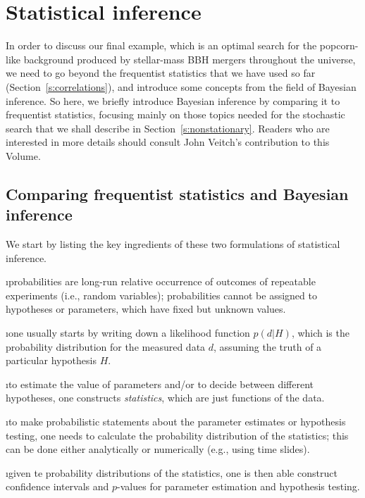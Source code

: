 \section{Statistical inference}
\label{s:statistical_inference}

In order to discuss our final example, which is an
optimal search for the popcorn-like background
produced by stellar-mass BBH mergers throughout the 
universe, we need to go beyond the frequentist 
statistics that we have used so far 
(Section~\ref{s:correlations}), 
and introduce some concepts from the field of Bayesian inference.
So here, we briefly introduce Bayesian inference by comparing 
it to frequentist statistics, focusing mainly on those topics 
needed for the stochastic search that we shall describe in
Section~\ref{s:nonstationary}.
Readers who are interested in more details should 
consult John Veitch's contribution to this Volume.

\subsection{Comparing frequentist statistics and Bayesian inference}

We start by listing the key ingredients of these two formulations 
of statistical inference.
\medskip


\bi

\i probabilities are long-run relative occurrence of 
outcomes of repeatable experiments (i.e., random variables);
probabilities cannot be assigned to hypotheses or parameters, 
which have fixed but unknown values.

\i one usually starts by writing down a likelihood 
function $p(d|H)$, which is the probability distribution 
for the measured data $d$, assuming the truth of a particular
hypothesis $H$.

\i to estimate the value of parameters and/or to decide
between different hypotheses, one constructs 
{\em statistics}, which are just functions of the data.

\i to make probabilistic statements about the 
parameter estimates or hypothesis testing, 
one needs to calculate
the probability distribution of the statistics;
this can be done either analytically or numerically 
(e.g., using time slides).

\i given te probability distributions of the statistics,
one is then able construct confidence intervals and 
$p$-values for parameter estimation and hypothesis 
testing.

